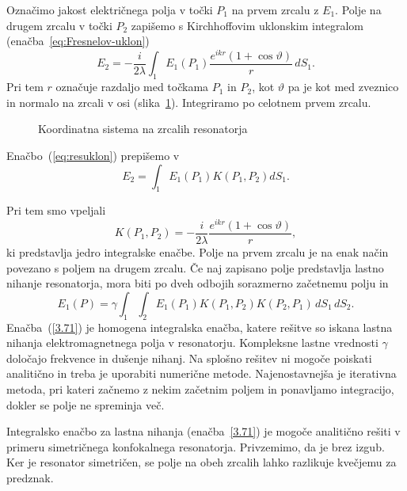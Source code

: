 Označimo jakost električnega polja v točki $P_{1}$ na prvem zrcalu z $E_{1}$.
Polje na drugem zrcalu v točki $P_2$ zapišemo s Kirchhoffovim uklonskim
integralom (enačba~\ref{eq:Fresnelov-uklon})
\begin{equation}
E_{2} =  -\frac{i}{2\lambda}\int_{1}E_{1}(P_{1})\frac{e^{ikr}(1+\cos\vartheta)}{r}\, dS_{1}.
\label{eq:resuklon}
\end{equation}
Pri tem $r$ označuje razdaljo med točkama $P_{1}$ in $P_{2}$, kot $\vartheta$ pa je 
kot med zveznico in normalo na zrcali v osi (slika~\ref{fig:uklon_res_shema}).
Integriramo po celotnem prvem zrcalu.  
\begin{figure}[ht]
\centering
\def\svgwidth{90truemm} 

\caption{Koordinatna sistema na zrcalih resonatorja}
\label{fig:uklon_res_shema}
\end{figure}

Enačbo~(\ref{eq:resuklon}) prepišemo v 
\begin{equation}
E_2 =  \int_{1}E_{1}(P_{1})K(P_{1},P_{2})dS_{1}.
\end{equation}

Pri tem smo vpeljali
\begin{equation}
K(P_{1},P_{2}) = -\frac{i}{2\lambda}\frac{e^{ikr}(1+\cos\vartheta)}{r},
\label{jedro}
\end{equation}
ki predstavlja jedro integralske enačbe. Polje na prvem zrcalu je 
na enak način povezano s poljem na drugem zrcalu. Če naj zapisano polje predstavlja lastno nihanje
resonatorja, mora biti po dveh odbojih sorazmerno začetnemu polju in
\begin{equation}
E_{1}(P)=\gamma\int_{1}\int_{2}E_{1}(P_{1})K(P_{1},P_{2})K(P_{2},P_1)\, dS_{1}\, dS_{2}.
\label{3.71}
\end{equation}
Enačba~(\ref{3.71}) je homogena integralska enačba, katere
rešitve so iskana lastna nihanja elektromagnetnega polja v resonatorju.
Kompleksne lastne vrednosti $\gamma$ določajo frekvence in dušenje
nihanj. Na splošno rešitev ni mogoče poiskati analitično in treba je uporabiti 
numerične metode. Najenostavnejša je iterativna
metoda, pri kateri začnemo z nekim začetnim poljem in ponavljamo integracijo, 
dokler se polje ne spreminja več.

Integralsko enačbo za lastna nihanja (enačba~\ref{3.71}) je mogoče analitično rešiti v primeru
simetričnega konfokalnega resonatorja. Privzemimo, da je brez izgub. 
Ker je resonator simetričen, se polje na obeh zrcalih lahko razlikuje kvečjemu
za predznak.

